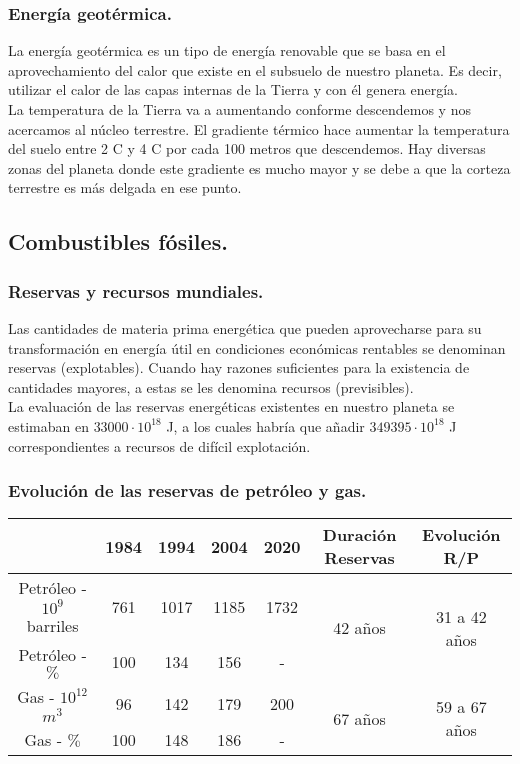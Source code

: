			\subsubsection{Energía geotérmica.}
				La energía geotérmica es un tipo de energía renovable que se basa en el aprovechamiento del calor
				que existe en el subsuelo de nuestro planeta. Es decir, utilizar el calor de las capas internas de la
				Tierra y con él genera energía.\\
				\indent La temperatura de la Tierra va a aumentando conforme descendemos y nos acercamos al núcleo
				terrestre. El gradiente térmico hace aumentar la temperatura del suelo entre 2 \textdegree C y 4 \textdegree C por cada 100 metros que descendemos. Hay diversas zonas del planeta donde este gradiente es mucho mayor y se debe
				a que la corteza terrestre es más delgada en ese punto.
		
		\subsection{Combustibles fósiles.}
			\subsubsection{Reservas y recursos mundiales.}
				Las cantidades de materia prima energética que pueden aprovecharse para su transformación en energía útil en condiciones económicas rentables se denominan reservas (explotables). Cuando hay razones suficientes para la
				existencia de cantidades mayores, a estas se les denomina recursos (previsibles).\\
				\indent La evaluación de las reservas energéticas existentes en nuestro planeta se estimaban en\linebreak
				 $33000\cdot10^{18}$ J, a los cuales habría que añadir $349395\cdot10^{18}$ J correspondientes a recursos de difícil explotación.
		
			\subsubsection{Evolución de las reservas de petróleo y gas.}
				\begin{center}
					\renewcommand{\arraystretch}{1.4}
					\begin{tabular}{|c|c|c|c|c|c|c|}
							\hline
								& \textbf{1984} & \textbf{1994} & \textbf{2004} & \textbf{2020} & \textbf{Duración Reservas} & \textbf{Evolución R/P}\\
							\hline
							Petróleo - $10^9$ barriles & 761 & 1017 & 1185 & 1732 & \multirow{2}{*}{42 años} & \multirow{2}{*}{31 a 42 años}\\
							Petróleo - $\%$ & 100 & 134 & 156 & - & & \\
							\hline
							Gas - $10^{12}$ $\textit{m}^3$	& 96 & 142 & 179 & 200 & \multirow{2}{*}{67 años} & \multirow{2}{*}{59 a 67 años}\\
							Gas - $\%$ & 100 & 148 & 186 & - & & \\
							\hline
					\end{tabular}
				\end{center}
				
